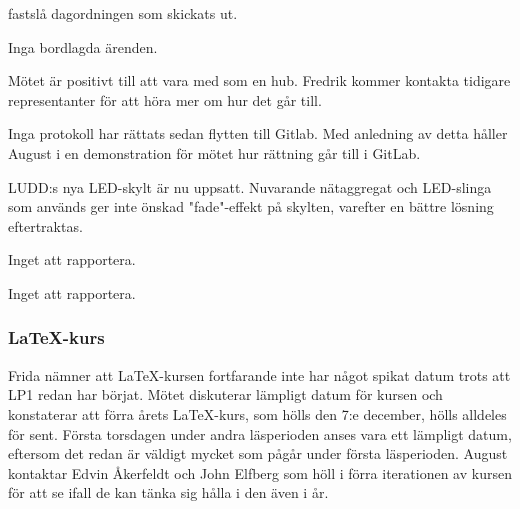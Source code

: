 \documentclass{protokoll}
\begin{document}
\newpage  


\begin{beslut}
     \att fastslå dagordningen som skickats ut.
\end{beslut}

Inga bordlagda ärenden.

Mötet är positivt till att vara med som en hub. Fredrik kommer kontakta tidigare representanter för att höra mer om hur det går till.

Inga protokoll har rättats sedan flytten till Gitlab. Med anledning av detta håller August i en demonstration för mötet hur rättning går till i GitLab. 

LUDD:s nya LED-skylt är nu uppsatt. Nuvarande nätaggregat och LED-slinga som används ger inte önskad "fade"-effekt på skylten, varefter en bättre lösning eftertraktas. %

Inget att rapportera. 

Inget att rapportera. 

\subsubsection{LaTeX-kurs}
Frida nämner att LaTeX-kursen fortfarande inte har något spikat datum trots att LP1 redan har börjat. Mötet diskuterar lämpligt datum för kursen och konstaterar att förra årets LaTeX-kurs, som hölls den 7:e december, hölls alldeles för sent. 
Första torsdagen under andra läsperioden anses vara ett lämpligt datum, eftersom det redan är väldigt mycket som pågår under första läsperioden. 
August kontaktar Edvin Åkerfeldt och John Elfberg som höll i förra iterationen av kursen för att se ifall de kan tänka sig hålla i den även i år. 
\end{document}
